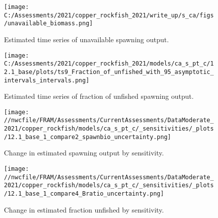\documentclass[11pt,
  english,
  a4paper,
]{article}
\begin{document}
\tagmcend\tagstructend


\begin{figure}
\centering
\texttt{[image: C:/Assessments/2021/copper\_rockfish\_2021/write\_up/s\_ca/figs/unavailable\_biomass.png]}
\caption{Estimated time series of unavailable spawning output.\label{fig:ssb-unavailable}}
\end{figure}

\tagmcend\tagstructend


\begin{figure}
\centering
\texttt{[image: C:/Assessments/2021/copper\_rockfish\_2021/models/ca\_s\_pt\_c/12.1\_base/plots/ts9\_Fraction\_of\_unfished\_with\_95\_asymptotic\_intervals\_intervals.png]}
\caption{Estimated time series of fraction of unfished spawning output.\label{fig:depl}}
\end{figure}

\tagmcend\tagstructend


\begin{figure}
\centering
\texttt{[image: //nwcfile/FRAM/Assessments/CurrentAssessments/DataModerate\_2021/copper\_rockfish/models/ca\_s\_pt\_c/\_sensitivities/\_plots/12.1\_base\_1\_compare2\_spawnbio\_uncertainty.png]}
\caption{Change in estimated spawning output by sensitivity.\label{fig:sens-ssb-1}}
\end{figure}

\tagmcend\tagstructend


\begin{figure}
\centering
\texttt{[image: //nwcfile/FRAM/Assessments/CurrentAssessments/DataModerate\_2021/copper\_rockfish/models/ca\_s\_pt\_c/\_sensitivities/\_plots/12.1\_base\_1\_compare4\_Bratio\_uncertainty.png]}
\caption{Change in estimated fraction unfished by sensitivity.\label{fig:sens-depl-1}}
\end{figure}
\end{document}
